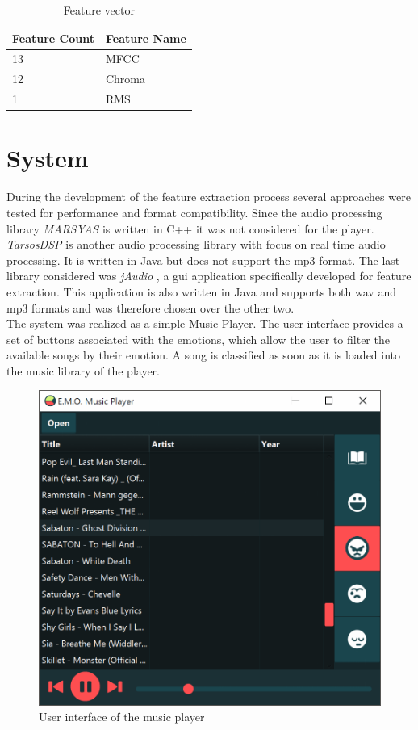 \documentclass{sigchi-ext}
\begin{document}
\begin{table}
\centering
\begin{tabular}{@{}ll@{}}
Feature Count & Feature Name \\ \midrule
13 & MFCC \\
12 & Chroma \\
1  & RMS
\end{tabular}
\caption{Feature vector}
\label{feature-vector}
\end{table}

\section{System}
During the development of the feature extraction process several approaches were tested for performance and format compatibility. Since the audio processing library \textit{MARSYAS} \cite{Tzanetakis1999} is written in C++ it was not considered for the player. \textit{TarsosDSP} \cite{Six2014} is another audio processing library with focus on real time audio processing. It is written in Java but does not support the mp3 format. The last library considered was \textit{jAudio} \cite{McEnnis2005}, a gui application specifically developed for feature extraction. This application is also written in Java and supports both wav and mp3 formats and was therefore chosen over the other two.\\

The system was realized as a simple Music Player. The user interface provides a set of buttons associated with the emotions, which allow the user to filter the available songs by their emotion. A song is classified as soon as it is loaded into the music library of the player.

\begin{figure}
	\label{screenshot}
	\includegraphics[width=\linewidth]{images/screenshot.png}
	\caption{User interface of the music player}
\end{figure}
\end{document}

